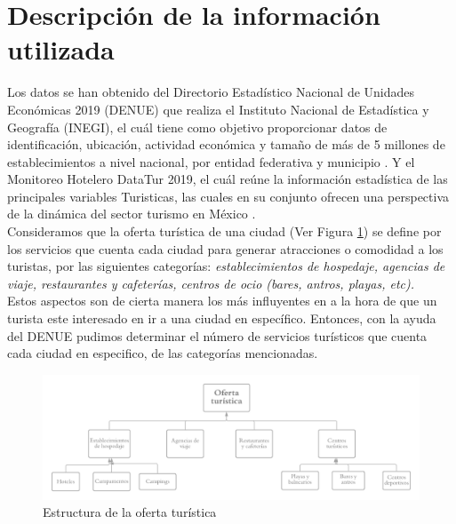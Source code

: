 \documentclass[11pt,letterpaper]{article}
\begin{document}
\section{Descripción de la información utilizada}
Los datos se han obtenido del Directorio Estadístico Nacional de Unidades Económicas 2019 (DENUE) que realiza el Instituto Nacional de Estadística y Geografía (INEGI), el cuál tiene como objetivo proporcionar datos de identificación, ubicación, actividad económica y tamaño de más de 5 millones de establecimientos a nivel nacional, por entidad federativa y municipio \cite{denue}. Y el Monitoreo Hotelero DataTur 2019, el cuál reúne la información estadística de las principales variables Turisticas, las cuales en su conjunto ofrecen una perspectiva de la dinámica del sector turismo en México \cite{datatour}. \\

Consideramos que la oferta turística de una ciudad (Ver Figura \ref{fig:diagrama_oferta}) se define por los servicios que cuenta cada ciudad para generar atracciones o comodidad a los turistas, por las siguientes categorías: \textit{establecimientos de hospedaje, agencias de viaje, restaurantes y cafeterías, centros de ocio (bares, antros, playas, etc).} \\

Estos aspectos son de cierta manera los más influyentes en a la hora de que un turista este interesado en ir a una ciudad en específico. Entonces, con la ayuda del DENUE pudimos determinar el número de servicios turísticos que cuenta cada ciudad en especifico, de las categorías mencionadas.   
\begin{figure}[H]
    \centering
    \includegraphics[scale=0.3]{figure/diagrama_oferta.png}
    \caption{Estructura de la oferta turística}
    \label{fig:diagrama_oferta}
\end{figure}
\end{document}
